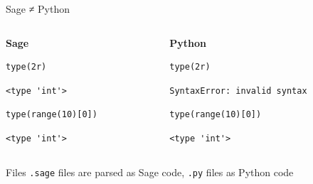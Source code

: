 \documentclass[presentation,smaller]{beamer}
\begin{document}
\begin{frame}[fragile,label={sec:org09b4de6}]{Sage ≠ Python}
 \begin{columns}[t]
\begin{column}{0.45\columnwidth}
\textbf{Sage}

\lstset{language=sage,label= ,caption= ,captionpos=b,numbers=none}
\begin{lstlisting}
type(2r)
\end{lstlisting}

\begin{verbatim}
<type 'int'>
\end{verbatim}

\lstset{language=sage,label= ,caption= ,captionpos=b,numbers=none}
\begin{lstlisting}
type(range(10)[0])
\end{lstlisting}

\begin{verbatim}
<type 'int'>
\end{verbatim}
\end{column}

\begin{column}{0.45\columnwidth}
\textbf{Python}

\lstset{language=Python,label= ,caption= ,captionpos=b,numbers=none}
\begin{lstlisting}
type(2r)
\end{lstlisting}

\begin{verbatim}
SyntaxError: invalid syntax
\end{verbatim}

\lstset{language=Python,label= ,caption= ,captionpos=b,numbers=none}
\begin{lstlisting}
type(range(10)[0])
\end{lstlisting}

\begin{verbatim}
<type 'int'>
\end{verbatim}
\end{column}
\end{columns}


\begin{block}{Files}
\texttt{.sage} files are parsed as Sage code, \texttt{.py} files as Python code
\end{block}
\end{frame}
\end{document}
